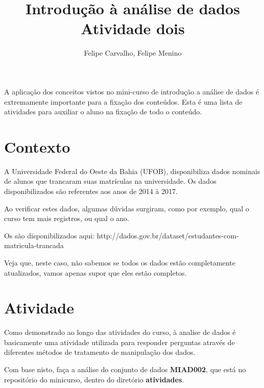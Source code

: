 \documentclass[12pt]{article}
\title{Introdução à análise de dados\\ Atividade dois}
\author{Felipe Carvalho\inst{1}, Felipe Menino\inst{1}}
\begin{document}
 

\maketitle

     
\begin{resumo} 
    A aplicação dos conceitos vistos no mini-curso de introdução a análise de dados é extremamente importante para a fixação dos conteúdos. Esta é uma lista de atividades para auxiliar o aluno na fixação de todo o conteúdo.
\end{resumo}

\section{Contexto}

A Universidade Federal do Oeste da Bahia (UFOB), disponibiliza dados nominais de alunos que trancaram suas matrículas na universidade. Os dados disponibilizados são referentes aos anos de 2014 à 2017.

Ao verificar estes dados, algumas dúvidas surgiram, como por exemplo, qual o curso tem mais registros, ou qual o ano.

Os são disponibilizados aqui: http://dados.gov.br/dataset/estudantes-com-matricula-trancada

Veja que, neste caso, não sabemos se todos os dados estão completamente atualizados, vamos apenas supor que eles estão completos.

\section{Atividade}

Como demonstrado ao longo das atividades do curso, à analise de dados é basicamente uma atividade utilizada para responder perguntas através de diferentes métodos de tratamento de manipulação dos dados.

Com base nisto, faça a análise do conjunto de dados \textbf{MIAD002}, que está no repositório do minicurso, dentro do diretório \textbf{atividades}.
\end{document}
